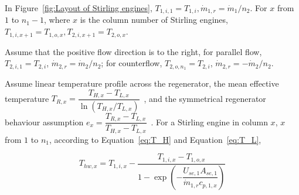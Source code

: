 
In Figure~\ref{fig:Layout of Stirling engines}, $T_{1,i,1}=T_{1,i},\dot{m}_{1,r}=\dot{m}_{1}/n_{2}$. For $x$ from $1$ to $n_1-1$, where $x$ is the column number of Stirling engines, $T_{1,i,x+1}=T_{1,o,x},T_{2,i,x+1}=T_{2,o,x}$.

Assume that the positive flow direction is to the right, for parallel flow, $T_{2,i,1}=T_{2,i}$, $\dot{m}_{2,r}=\dot{m}_{2}/n_{2}$; for counterflow, $T_{2,o,n_1}=T_{2,i}$, $\dot{m}_{2,r}=-\dot{m}_{2}/n_{2}$.


%

Assume linear temperature profile across the regenerator, the mean effective temperature $T_{R,x}=\dfrac{T_{H,x}-T_{L,x}}{\ln(T_{H,x}/T_{L,x})}$~\cite{Der2007,Cavazzuti2012}, and the symmetrical regenerator behaviour assumption $e_{x}=\dfrac{T_{R,x}-T_{L,x}}{T_{H,x}-T_{L,x}}$~\cite{Formosa2010,Juhasz2010}. For a Stirling engine in column $x$, $x$ from $1$ to $n_1$, according to Equation~\ref{eq:T_H} and Equation~\ref{eq:T_L},

\begin{equation}
	T_{hw,x}=T_{1,i,x}-\dfrac{T_{1,i,x}-T_{1,o,x}}{1-\exp(-\dfrac{U_{se,1}A_{se,1}}{\dot{m}_{1,r}c_{p,1,x}})}\label{eq:T_H_x}
\end{equation}


